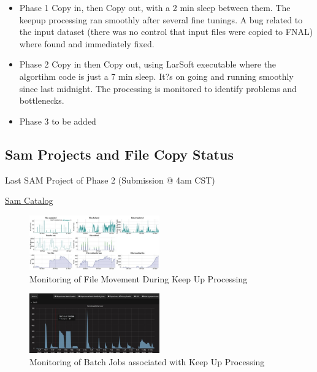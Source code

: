 \documentclass[pdftex,12pt,letter]{article}
\begin{document}
\begin{itemize}
\item Phase 1 
Copy in, then Copy out, with a 2 min sleep between them.
The keepup processing ran smoothly after several fine tunings.
A bug related to the input dataset (there was no control that input files were copied to FNAL) where found and immediately fixed.

\item Phase 2 
Copy in then  Copy out, using LarSoft executable where the algortihm code is just a 7 min sleep. It?s on going and running smoothly since last midnight.
The processing is monitored to identify problems and bottlenecks.

\item Phase 3
\color{red} to be added
\color{black}

\end{itemize}

\subsection {Sam Projects and File Copy Status}
Last SAM Project of Phase 2 (Submission @ 4am CST)

\href{http://samweb.fnal.gov:8480/station_monitor/dune/stations/dune/projects/dunepro-null_lar.sh_20171110_040116_3425472}{Sam Catalog}



\begin{figure}[tbh]
  \centering
  \includegraphics[width=0.5\textwidth]{./ReportImages/SamProjectsKeepupoutput.jpg}
  \caption{Monitoring of File Movement During Keep Up Processing}
  \label{fig:FTSKeepUPProcessing}
\end{figure}



\begin{figure}[tbh]
  \centering
  \includegraphics[width=0.5\textwidth]{./ReportImages/FIFEMonkeepup.jpg}
  \caption{Monitoring of Batch Jobs associated with Keep Up Processing}
  \label{fig:FIFEmon}
\end{figure}
\end{document}

